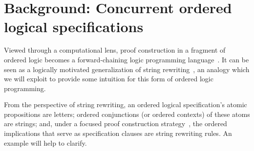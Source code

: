 \documentclass[
  class=../hdeyoung-proposal,
  crop=false
]{standalone}
\begin{document}
\section{Background: Concurrent ordered logical specifications}\label{sec:ordered-lp}

Viewed through a computational lens, proof construction in a fragment of ordered logic becomes a forward-chaining logic programming language~\autocite{Pfenning+Simmons:LICS09}.
It can be seen as a logically motivated generalization of string rewriting~\autocite[see, \eg,][]{Book+Otto:SRS93}, an analogy which we will exploit to provide some intuition for this form of ordered logic programming.

From the perspective of string rewriting, an ordered logical specification's atomic propositions are letters; ordered conjunctions (or ordered contexts) of these atoms are strings; and, under a focused proof construction strategy~\autocite{Andreoli:JLC92}, the ordered implications that serve as specification clauses are string rewriting rules.
An example will help to clarify.





\end{document}

